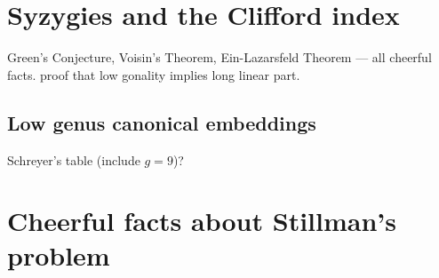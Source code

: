 \section{Syzygies and the Clifford index}
Green's Conjecture, Voisin's Theorem, Ein-Lazarsfeld Theorem --- all cheerful facts. proof that low gonality implies long linear part.

\subsection{Low genus canonical embeddings} Schreyer's table (include $g=9$)?

\section{Cheerful facts about Stillman's problem}

